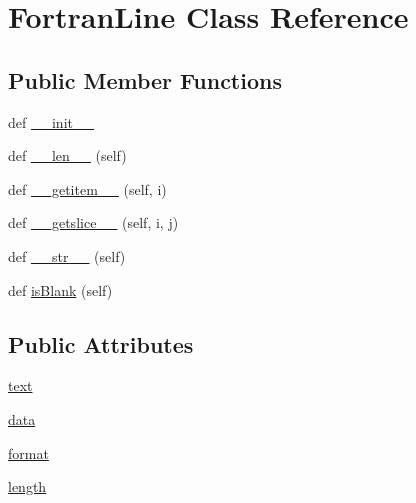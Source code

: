 \hypertarget{classpyneb_1_1utils_1_1_fortran_format_1_1_fortran_line}{}\section{Fortran\+Line Class Reference}
\label{classpyneb_1_1utils_1_1_fortran_format_1_1_fortran_line}
\subsection*{Public Member Functions}
\begin{DoxyCompactItemize}
\item 
def \hyperlink{classpyneb_1_1utils_1_1_fortran_format_1_1_fortran_line_ac775ee34451fdfa742b318538164070e}{\+\_\+\+\_\+init\+\_\+\+\_\+}
\item 
def \hyperlink{classpyneb_1_1utils_1_1_fortran_format_1_1_fortran_line_a810fdc262754b6d21f5acd0e280d4daf}{\+\_\+\+\_\+len\+\_\+\+\_\+} (self)
\item 
def \hyperlink{classpyneb_1_1utils_1_1_fortran_format_1_1_fortran_line_af2c6b7930c773edecd6d320e4c263421}{\+\_\+\+\_\+getitem\+\_\+\+\_\+} (self, i)
\item 
def \hyperlink{classpyneb_1_1utils_1_1_fortran_format_1_1_fortran_line_a0509753bf407bc642e4f9e41ae334f8b}{\+\_\+\+\_\+getslice\+\_\+\+\_\+} (self, i, j)
\item 
def \hyperlink{classpyneb_1_1utils_1_1_fortran_format_1_1_fortran_line_a23e8041ce1015febe4fdace3225714f9}{\+\_\+\+\_\+str\+\_\+\+\_\+} (self)
\item 
def \hyperlink{classpyneb_1_1utils_1_1_fortran_format_1_1_fortran_line_ac77c28a34d50c4e3a5faef3882ba978c}{is\+Blank} (self)
\end{DoxyCompactItemize}
\subsection*{Public Attributes}
\begin{DoxyCompactItemize}
\item 
\hyperlink{classpyneb_1_1utils_1_1_fortran_format_1_1_fortran_line_af575f17e6be3f269b86b041a60560dbf}{text}
\item 
\hyperlink{classpyneb_1_1utils_1_1_fortran_format_1_1_fortran_line_a511ae0b1c13f95e5f08f1a0dd3da3d93}{data}
\item 
\hyperlink{classpyneb_1_1utils_1_1_fortran_format_1_1_fortran_line_a387137c43ed9616d39ba90e890d181eb}{format}
\item 
\hyperlink{classpyneb_1_1utils_1_1_fortran_format_1_1_fortran_line_af9d495c1655d813d553030485d00fea7}{length}
\end{DoxyCompactItemize}


